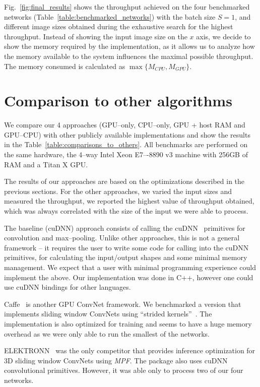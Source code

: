 \documentclass[conference]{./IEEEtran/IEEEtran}
\begin{document}
  Fig.~\ref{fig:final_results} shows the throughput achieved on the
  four benchmarked networks (Table~\ref{table:benchmarked_networks})
  with the batch size $S=1$, and different image sizes obtained during
  the exhaustive search for the highest throughput.  Instead of
  showing the input image size on the $x$ axis, we decide to show the
  memory required by the implementation, as it allows us to analyze
  how the memory available to the system influences the maximal
  possible throughput.  The memory consumed is calculated as
  $\max\{M_{CPU},M_{GPU}\}$.


\section{Comparison to other algorithms}

  We compare our 4 approaches (GPU--only, CPU--only, GPU + host RAM
  and GPU--CPU) with other publicly available implementations and show
  the results in the Table~\ref{table:comparisons_to_others}.  All
  benchmarks are performed on the same hardware, the 4--way Intel Xeon
  E7–-8890 v3 machine with 256GB of RAM and a Titan X GPU.

  The results of our approaches are based on the optimizations
  described in the previous sections.  For the other approaches, we
  varied the input sizes and measured the throughput, we reported the
  highest value of throughput obtained, which was always correlated
  with the size of the input we were able to process.

  The baseline (cuDNN) approach consists of calling the
  cuDNN~\cite{chetlur2014cudnn} primitives for convolution and
  max--pooling.  Unlike other approaches, this is not a general
  framework -- it requires the user to write some code for calling
  into the cuDNN primitives, for calculating the input/output shapes
  and some minimal memory management.  We expect that a user with
  minimal programming experience could implement the above.  Our
  implementation was done in C++, however one could use cuDNN bindings
  for other languages.

  Caffe~\cite{jia2014caffe} is another GPU ConvNet framework.  We
  benchmarked a version that implements sliding window ConvNets using
  ``strided kernels''~\cite{tschopp2015efficient}.  The implementation
  is also optimized for training and seems to have a huge memory
  overhead as we were only able to run the smallest of the networks.

  ELEKTRONN~\cite{ELEKTRONN2015} was the only competitor that provides
  inference optimization for 3D sliding window ConvNets using
  \emph{MPF}.  The package also uses cuDNN convolutional primitives.
  However, it was able only to process two of our four networks.
\end{document}

